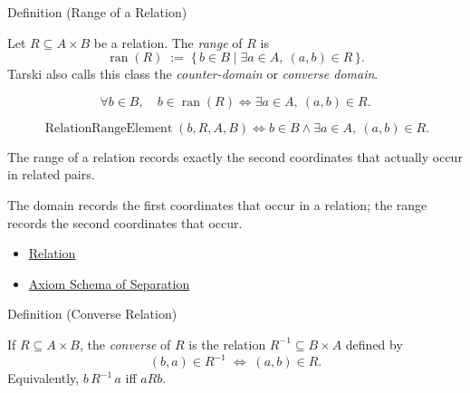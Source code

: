 \begin{definitionbox}{Definition (Range of a Relation)}
\begin{definition}\label{def:relation-range}
Let $R\subseteq A\times B$ be a relation. The \emph{range} of $R$ is
\[
\operatorname{ran}(R)
\;:=\;
\{\,b\in B\mid \exists a\in A,\ (a,b)\in R\,\}.
\]
Tarski also calls this class the \emph{counter-domain} or \emph{converse domain}.
\end{definition}
\end{definitionbox}

\begin{remark*}
\[
  \forall b\in B,\quad
  b\in\operatorname{ran}(R)
  \iff
  \exists a\in A,\ (a,b)\in R.
\]
\end{remark*}

\begin{remark*}
\[
  \operatorname{RelationRangeElement}(b,R,A,B)
  \iff
  b\in B \wedge \exists a\in A,\ (a,b)\in R.
\]
\end{remark*}

\begin{remark*}[Interpretation]
The range of a relation records exactly the second coordinates that actually
occur in related pairs.
\end{remark*}

\begin{remark*}[Exposition]
The domain records the first coordinates that occur in a relation; the range
records the second coordinates that occur.
\end{remark*}

\begin{dependencies}
\begin{itemize}
  \item \hyperref[def:relation]{Relation}
  \item \hyperref[ax:separation]{Axiom Schema of Separation}
\end{itemize}
\end{dependencies}

\begin{definitionbox}{Definition (Converse Relation)}
\begin{definition}\label{def:converse-relation}
If $R\subseteq A\times B$, the \emph{converse} of $R$ is the relation
$R^{-1}\subseteq B\times A$ defined by
\[
(b,a)\in R^{-1}
\;\Longleftrightarrow\;
(a,b)\in R.
\]
Equivalently, $b\,R^{-1}\,a$ iff $aRb$.
\end{definition}
\end{definitionbox}


